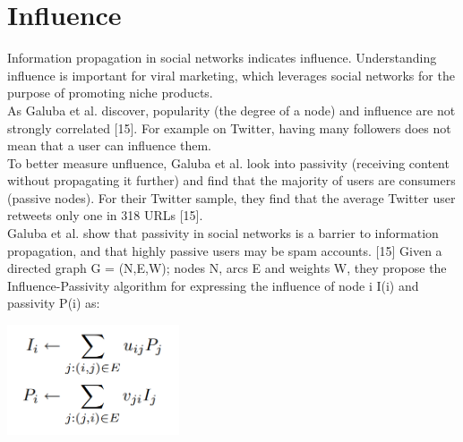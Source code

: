 \documentclass[conference,letterpaper]{IEEEtran}
\begin{document}
\section{Influence}

Information propagation in social networks indicates influence. Understanding influence is important for
viral marketing, which leverages social networks for the purpose of promoting niche products.\\
As Galuba et al. discover, popularity (the degree of a node) and influence are not strongly correlated [15].
For example on Twitter, having many followers does not mean that a user can influence them. \\
To better measure unfluence, Galuba et al. look into passivity (receiving content without propagating it further)
and find that the majority of users are consumers (passive nodes). For their Twitter sample, they find that the
average Twitter user retweets only one in 318 URLs [15]. \\
Galuba et al. show that passivity in social networks is a barrier to information propagation, and that highly
passive users may be spam accounts. [15] Given a directed graph G = (N,E,W); nodes N, arcs E and weights W,
they propose the Influence-Passivity algorithm for expressing the influence of node i I(i) and passivity P(i) as:\\

\centerline{
  \includegraphics[width=2.0in]{influence_passivity.png}
}
\end{document}
